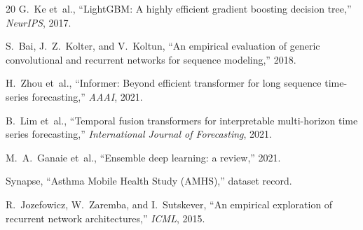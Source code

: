 \documentclass[11pt,a4paper]{article}
\begin{document}
\begin{thebibliography}{20}
G.~Ke et~al., ``LightGBM: A highly efficient gradient boosting decision
tree,'' \emph{NeurIPS}, 2017.

S.~Bai, J.~Z.~Kolter, and V.~Koltun, ``An empirical evaluation of generic
convolutional and recurrent networks for sequence modeling,'' 2018.

H.~Zhou et~al., ``Informer: Beyond efficient transformer for long sequence
time-series forecasting,'' \emph{AAAI}, 2021.

B.~Lim et~al., ``Temporal fusion transformers for interpretable multi-horizon
time series forecasting,'' \emph{International Journal of Forecasting}, 2021.

M.~A.~Ganaie et~al., ``Ensemble deep learning: a review,'' 2021.

Synapse, ``Asthma Mobile Health Study (AMHS),'' dataset record.

R.~Jozefowicz, W.~Zaremba, and I.~Sutskever, ``An empirical exploration of
recurrent network architectures,'' \emph{ICML}, 2015.

\end{thebibliography}
\end{document}
